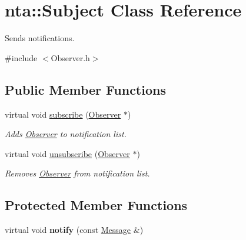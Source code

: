\hypertarget{classnta_1_1Subject}{}\section{nta\+:\+:Subject Class Reference}
\label{classnta_1_1Subject}


Sends notifications.  




{\ttfamily \#include $<$Observer.\+h$>$}

\subsection*{Public Member Functions}
\begin{DoxyCompactItemize}
\item 
\mbox{\label{classnta_1_1Subject_a37d15cb0563d1c9ea93be398aaf28df7}} 
virtual void \hyperlink{classnta_1_1Subject_a37d15cb0563d1c9ea93be398aaf28df7}{subscribe} (\hyperlink{classnta_1_1Observer}{Observer} $\ast$)
\begin{DoxyCompactList}\small\item\em Adds \hyperlink{classnta_1_1Observer}{Observer} to notification list. \end{DoxyCompactList}\item 
\mbox{\label{classnta_1_1Subject_ab74c154ace2f59dafe154fe5c7416e8c}} 
virtual void \hyperlink{classnta_1_1Subject_ab74c154ace2f59dafe154fe5c7416e8c}{unsubscribe} (\hyperlink{classnta_1_1Observer}{Observer} $\ast$)
\begin{DoxyCompactList}\small\item\em Removes \hyperlink{classnta_1_1Observer}{Observer} from notification list. \end{DoxyCompactList}\end{DoxyCompactItemize}
\subsection*{Protected Member Functions}
\begin{DoxyCompactItemize}
\item 
\mbox{\label{classnta_1_1Subject_a5f52e0bcb0662b943a49f7dcde00f4c5}} 
virtual void {\bfseries notify} (const \hyperlink{structnta_1_1Message}{Message} \&)
\end{DoxyCompactItemize}
